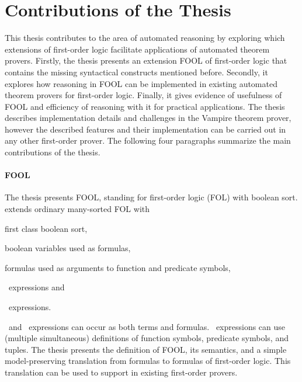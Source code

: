 \section*{Contributions of the Thesis}
\label{sect:intro:contributions}
This thesis contributes to the area of automated reasoning by exploring which extensions of first-order logic facilitate applications of automated theorem provers. Firstly, the thesis presents an extension FOOL of first-order logic that contains the missing syntactical constructs mentioned before. Secondly, it explores how reasoning in FOOL can be implemented in existing automated theorem provers for first-order logic. Finally, it gives evidence of usefulness of FOOL and efficiency of reasoning with it for practical applications. The thesis describes implementation details and challenges in the Vampire theorem prover, however the described features and their implementation can be carried out in any other first-order prover. The following four paragraphs summarize the main contributions of the thesis.


\paragraph{FOOL}
The thesis presents FOOL, standing for first-order logic (FOL) with boolean sort. \folb{} extends ordinary many-sorted FOL with \begin{enumerate*}[label=(\roman*)]\item first class boolean sort, \item boolean variables used as formulas, \item formulas used as arguments to function and predicate symbols, \item \ITE\ expressions and \item \LETIN\ expressions.\end{enumerate*} \ITE\ and \LETIN\ expressions can occur as both terms and formulas. \LETIN\ expressions can use (multiple simultaneous) definitions of function symbols, predicate symbols, and tuples. The thesis presents the definition of FOOL, its semantics, and a simple model-preserving translation from \folb{} formulas to formulas of first-order logic. This translation can be used to support \folb{} in existing first-order provers.

